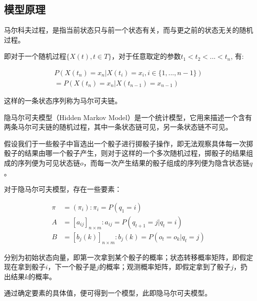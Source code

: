 \documentclass[hyperref]{ctexart}
\begin{document}
\begin{multicols}{2}
	\subsection{模型原理}
	马尔科夫过程，是指当前状态只与前一个状态有关，而与更之前的状态无关的随机过程。\par
    即对于一个随机过程$\{X(t), t\in T\}$，对于任意取定的参数$t_1 < t_2 < ... < t_n$,
    \noindent 有: \par
	\begin{equation*}
	\begin{aligned}
	    P(X(t_n) = x_n | X(t_i) = x_i, i \in \{1,...,n - 1\})\\ = 
		P(X(t_n) = x_n | X(t_{n-1}) = x_{n - 1})
	\end{aligned}
	\end{equation*}\par
	\indent\par 这样的一条状态序列称为马尔可夫链。\par
	隐马尔可夫模型（Hidden Markov Model）是一个统计模型，它用来描述一个含有两条马尔可夫链的随机过程，其中一条状态链可见，另一条状态链不可见。\par
    假设我们于一些骰子中盲选出一个骰子进行掷骰子操作，即无法观察具体每一次掷骰子的结果由哪一个骰子产生，则对于这样的一个多次随机过程，掷骰子的结果组成的序列便为可见状态链$o$，而每一次产生结果的骰子组成的序列便为隐含状态链$q$。\par
    对于隐马尔可夫模型，存在一些要素：\par \indent\par
    \noindent
    \begin{equation*}
    \begin{aligned}
        \pi &= (\pi_i):\pi_i = P(q_1 = i)\\
        A &= [a_{ij}]_{n \times m} :a_{ij} = P(q_{t+1} = j|q_t = i)\\
        B &= [b_j(k)]_{n \times m}: b_j(k) = P(o_t = o_k|q_t = j)
    \end{aligned}
    \end{equation*}\par \indent\par
    分别为初始状态向量，即第一次拿到某个骰子的概率；状态转移概率矩阵，即假定现在拿到骰子$i$，下一个骰子是$j$的概率；观测概率矩阵，即假定拿到了骰子$j$，扔出结果$k$的概率。\par
    通过确定要素的具体值，便可得到一个模型，此即隐马尔可夫模型。

\end{multicols}
\end{document}
